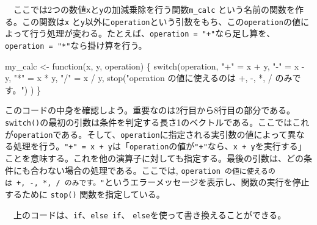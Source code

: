 \documentclass[
  a4paper,
  pandoc,
  ja=standard,
  jafont=haranoaji]{bxjsbook}
\newenvironment{Shaded}{\begin{snugshade}}{\end{snugshade}}
\newcommand{\ControlFlowTok}[1]{\textcolor[rgb]{0.00,0.48,0.65}{#1}}
\newcommand{\FunctionTok}[1]{\textcolor[rgb]{0.28,0.35,0.67}{#1}}
\newcommand{\NormalTok}[1]{\textcolor[rgb]{0.00,0.48,0.65}{#1}}
\newcommand{\OtherTok}[1]{\textcolor[rgb]{0.00,0.48,0.65}{#1}}
\newcommand{\SpecialCharTok}[1]{\textcolor[rgb]{0.37,0.37,0.37}{#1}}
\newcommand{\StringTok}[1]{\textcolor[rgb]{0.13,0.47,0.30}{#1}}
\begin{document}
　ここでは2つの数値\texttt{x}と\texttt{y}の加減乗除を行う関数\texttt{m\_calc}
という名前の関数を作る。この関数は\texttt{x}
と\texttt{y}以外に\texttt{operation}という引数をもち、この\texttt{operation}の値によって行う処理が変わる。たとえば、\texttt{operation\ =\ "+"}なら足し算を、\texttt{operation\ =\ "*"}なら掛け算を行う。

\begin{Shaded}
\begin{Highlighting}[numbers=left,,]
\NormalTok{my\_calc }\OtherTok{\textless{}{-}} \ControlFlowTok{function}\NormalTok{(x, y, operation) \{}
  \ControlFlowTok{switch}\NormalTok{(operation,}
         \StringTok{"+"} \OtherTok{=}\NormalTok{ x }\SpecialCharTok{+}\NormalTok{ y,}
         \StringTok{"{-}"} \OtherTok{=}\NormalTok{ x }\SpecialCharTok{{-}}\NormalTok{ y,}
         \StringTok{"*"} \OtherTok{=}\NormalTok{ x }\SpecialCharTok{*}\NormalTok{ y,}
         \StringTok{"/"} \OtherTok{=}\NormalTok{ x }\SpecialCharTok{/}\NormalTok{ y,}
         \FunctionTok{stop}\NormalTok{(}\StringTok{"operation の値に使えるのは +, {-}, *, / のみです。"}\NormalTok{)}
\NormalTok{         )}
\NormalTok{\}}
\end{Highlighting}
\end{Shaded}

このコードの中身を確認しよう。重要なのは2行目から8行目の部分である。\texttt{switch()}の最初の引数は条件を判定する長さ1のベクトルである。ここではこれが\texttt{operation}である。そして、\texttt{operation}に指定される実引数の値によって異なる処理を行う。\texttt{"+"\ =\ x\ +\ y}は「\texttt{operation}の値が\texttt{"+"}なら、\texttt{x\ +\ y}を実行する」ことを意味する。これを他の演算子に対しても指定する。最後の引数は、どの条件にも合わない場合の処理である。ここでは,
\texttt{operation\ の値に使えるのは\ +,\ -,\ *,\ /\ のみです。"}というエラーメッセージを表示し、関数の実行を停止するために
\texttt{stop()} 関数を指定している。

　上のコードは、\texttt{if}、\texttt{else\ if}、
\texttt{else}を使って書き換えることができる。
\end{document}
